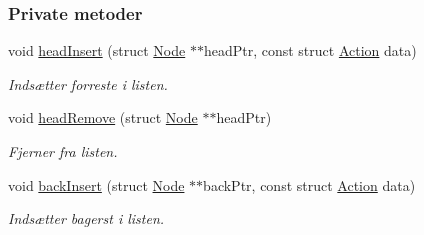 \subsubsection*{Private metoder}
\begin{DoxyCompactItemize}
\item 
void \hyperlink{class_queue_a1189c09234d75518492525645a05db07}{head\+Insert} (struct \hyperlink{queue_8c_struct_node}{Node} $\ast$$\ast$head\+Ptr, const struct \hyperlink{queue_8h_struct_action}{Action} data)
\begin{DoxyCompactList}\small\item\em Indsætter forreste i listen. \end{DoxyCompactList}\item 
void \hyperlink{class_queue_ae54666c891fd21d5497f48c385a00b74}{head\+Remove} (struct \hyperlink{queue_8c_struct_node}{Node} $\ast$$\ast$head\+Ptr)
\begin{DoxyCompactList}\small\item\em Fjerner fra listen. \end{DoxyCompactList}\item 
void \hyperlink{class_queue_a5a25a737ba7dff74923f5cb04e19164c}{back\+Insert} (struct \hyperlink{queue_8c_struct_node}{Node} $\ast$$\ast$back\+Ptr, const struct \hyperlink{queue_8h_struct_action}{Action} data)
\begin{DoxyCompactList}\small\item\em Indsætter bagerst i listen. \end{DoxyCompactList}\end{DoxyCompactItemize}
